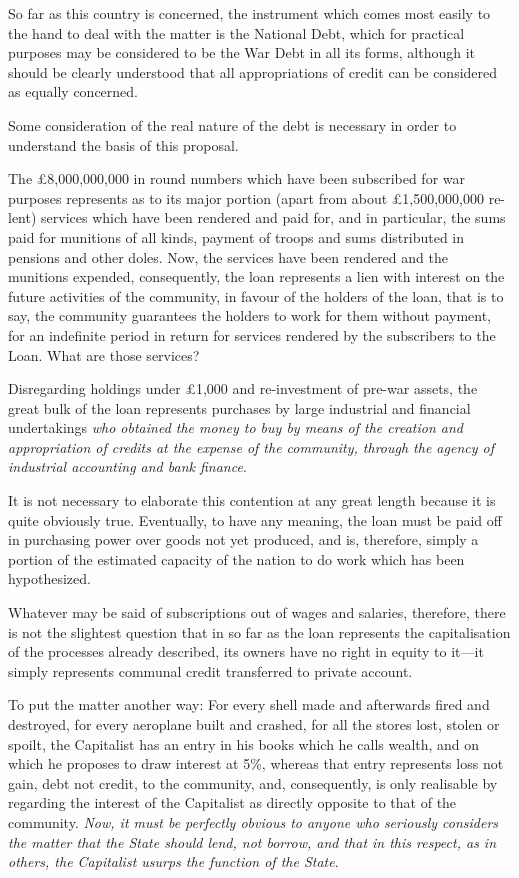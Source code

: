 \documentclass{book}
\begin{document}
So far as this country is concerned, the instrument which comes most easily to the hand to deal with the matter is the National Debt, which for practical purposes may be considered to be the War Debt in all its forms, although it should be clearly understood that all appropriations of credit can be considered as equally concerned.

Some consideration of the real nature of the debt is necessary in order to understand the basis of this proposal.

The £8,000,000,000 in round numbers which have been subscribed for war purposes represents as to its major portion (apart from about £1,500,000,000 re-lent) services which have been rendered and paid for, and in particular, the sums paid for munitions of all kinds, payment of troops and sums distributed in pensions and other doles. Now, the services have been rendered and the munitions expended, consequently, the loan represents a lien with interest on the future activities of the community, in favour of the holders of the loan, that is to say, the community guarantees the holders to work for them without payment, for an indefinite period in return for services rendered by the subscribers to the Loan. What are those services?

Disregarding holdings under £1,000 and re-investment of pre-war assets, the great bulk of the loan represents purchases by large industrial and financial undertakings \emph{who obtained the money to buy by means of the creation and appropriation of credits at the expense of the community, through the agency of industrial accounting and bank finance}.

It is not necessary to elaborate this contention at any great length because it is quite obviously true. Eventually, to have any meaning, the loan must be paid off in purchasing power over goods not yet produced, and is, therefore, simply a portion of the estimated capacity of the nation to do work which has been hypothesized.

Whatever may be said of subscriptions out of wages and salaries, therefore, there is not the slightest question that in so far as the loan represents the capitalisation of the processes already described, its owners have no right in equity to it—it simply represents communal credit transferred to private account.

To put the matter another way: For every shell made and afterwards fired and destroyed, for every aeroplane built and crashed, for all the stores lost, stolen or spoilt, the Capitalist has an entry in his books which he calls wealth, and on which he proposes to draw interest at 5\%, whereas that entry represents loss not gain, debt not credit, to the community, and, consequently, is only realisable by regarding the interest of the Capitalist as directly opposite to that of the community. \emph{Now, it must be perfectly obvious to anyone who seriously considers the matter that the State should lend, not borrow, and that in this respect, as in others, the Capitalist usurps the function of the State}.
\end{document}
